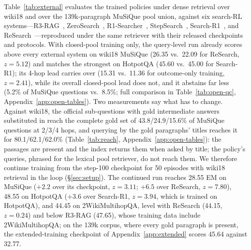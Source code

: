 Table~\ref{tab:external} evaluates the trained policies under dense
retrieval over wiki18 and over the 139k-paragraph MuSiQue pool union,
against six search-RL systems---R3-RAG~\citep{li2025r3},
ZeroSearch~\citep{sun2026zerosearch},
R1-Searcher~\citep{song2025r1searcher},
StepSearch~\citep{zheng-etal-2025-stepsearch},
Search-R1~\citep{jin2025searchr1}, and
ReSearch~\citep{chen2025research}---reproduced under the same retriever
with their released checkpoints and protocols. With closed-pool training
only, the query-level run already scores above every external system on
wiki18 MuSiQue (26.35 vs.\ 22.09 for ReSearch, $z=5.12$) and matches the
strongest on HotpotQA (45.60 vs.\ 45.00 for Search-R1); its 4-hop lead
carries over (15.31 vs.\ 11.36 for outcome-only training, $z=2.41$),
while its overall closed-pool lead does not, and it abstains far less
(5.2\% of MuSiQue questions vs.\ 8.5\%; full comparison in
Table~\ref{tab:open-qc}, Appendix~\ref{app:open-tables}). Two
measurements say what has to change. Against wiki18, the official
sub-questions with gold intermediate answers substituted in reach the
complete gold set of 43.8/24.9/15.6\% of MuSiQue questions at 2/3/4
hops, and querying by the gold paragraphs' titles reaches it for
80.1/62.1/62.0\% (Table~\ref{tab:reach}, Appendix~\ref{app:open-tables}):
the passages are present and the index returns them when asked by
title; the policy's queries, phrased for the lexical pool retriever, do
not reach them. We therefore continue training from the step-100
checkpoint for 50 episodes with wiki18 retrieval in the loop
(\S\ref{sec:setup}). The continued run reaches 28.55 EM on MuSiQue
($+2.2$ over its checkpoint, $z=3.11$; $+6.5$ over ReSearch, $z=7.80$),
48.55 on HotpotQA ($+3.6$ over Search-R1, $z=3.94$, which is trained on
HotpotQA), and 44.45 on 2WikiMultihopQA, level with ReSearch (44.15,
$z=0.24$) and below R3-RAG (47.65), whose training data include
2WikiMultihopQA; on the 139k corpus, where every
gold paragraph is present, the extended-training checkpoint of
Appendix~\ref{app:extended} scores 45.64 against 32.77.

